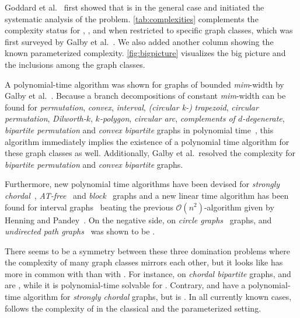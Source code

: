 Goddard et al.~\cite{Goddard2014} first showed that \SDOM is \NPc in the general case and initiated the systematic analysis of the problem.  
\cref{tab:complexities} complements the complexity status for \doms, \sdoms, and \tdoms when restricted to specific graph classes, which was first surveyed by Galby et al.~\cite{Galby2020}.
We also added another column showing the known parameterized complexity. 
\cref{fig:bigpicture} visualizes the big picture and the inclusions among the graph classes.

A polynomial-time algorithm was shown for graphs of bounded \textit{mim}-width by Galby et al.~\cite{Galby2020}.
Because a branch decompositions of constant \textit{mim}-width can be found for \textit{permutation}, \textit{convex}, \textit{interval}, \textit{(circular k-)} \textit{trapezoid}, \textit{circular permutation}, \textit{Dilworth-$k$}, \textit{$k$-polygon}, \textit{circular arc}, \textit{complements of $d$-degenerate}, \textit{bipartite permutation} and \textit{convex bipartite} graphs in polynomial time~\cite{Belmonte2011}, this algorithm immediately implies the existence of a polynomial time algorithm for these graph classes as well. 
Additionally, Galby et al.~\cite{Galby2020}resolved the complexity for \textit{bipartite permutation} and \textit{convex bipartite} graphs.

Furthermore, new polynomial time algorithms have been devised for \textit{strongly chordal}~\cite{Tripathi2021}, \textit{AT-free}~\cite{Kloks2021} and \textit{block}~\cite{Henning2022} graphs and a new linear time algorithm has been found for interval graphs~\cite{Pradhan2021} beating the previous $\mathcal{O}(n^2)$-algorithm given by Henning and Pandey~\cite{Henning2019}.
On the negative side, \sdom on \textit{circle graphs}~\cite{Kloks2021} graphs, and \textit{undirected path graphs}~\cite{Henning2019} was shown to be \NPc.

There seems to be a symmetry between these three domination problems where the complexity of many graph classes mirrors each other, but it looks like \sdoms has more in common with \doms than with \tdoms.
For instance, on \textit{chordal bipartite} graphs, \sdoms and \doms are \NPc, while it is polynomial-time solvable for \tdoms. 
Contrary, \sdoms and \doms have a polynomial-time algorithm for \textit{strongly chordal} graphs, but \tdoms is \NPc.
In all currently known cases, \sdom follows the complexity of \dom in the classical and the parameterized setting.

